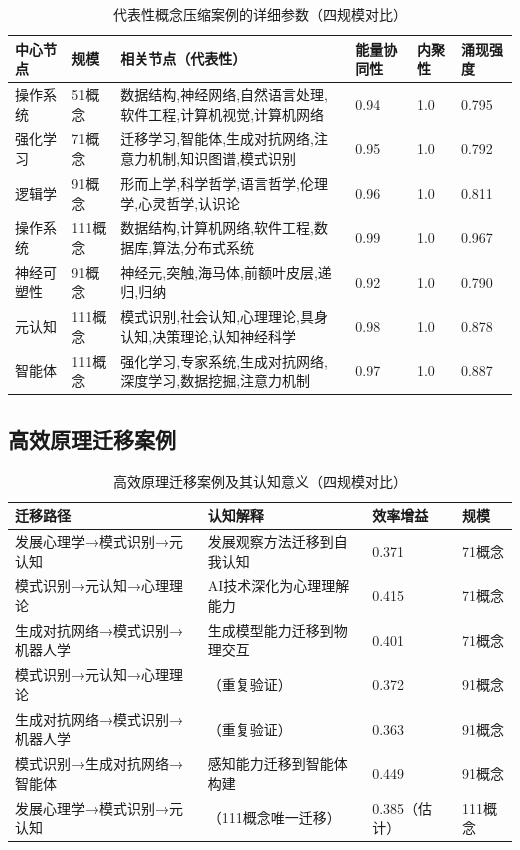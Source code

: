 \documentclass[12pt,a4paper]{article}
\begin{document}
\begin{table}[H]
\centering
\caption{代表性概念压缩案例的详细参数（四规模对比）}
\label{tab:compression_cases_detailed}
\begin{tabular}{p{2.5cm}p{1.5cm}p{3cm}p{1.5cm}p{1.5cm}p{1.5cm}}
\toprule
\textbf{中心节点} & \textbf{规模} & \textbf{相关节点（代表性）} & \textbf{能量协同性} & \textbf{内聚性} & \textbf{涌现强度} \\
\midrule
操作系统 & 51概念 & 数据结构,神经网络,自然语言处理,软件工程,计算机视觉,计算机网络 & 0.94 & 1.0 & 0.795 \\
强化学习 & 71概念 & 迁移学习,智能体,生成对抗网络,注意力机制,知识图谱,模式识别 & 0.95 & 1.0 & 0.792 \\
逻辑学 & 91概念 & 形而上学,科学哲学,语言哲学,伦理学,心灵哲学,认识论 & 0.96 & 1.0 & 0.811 \\
操作系统 & 111概念 & 数据结构,计算机网络,软件工程,数据库,算法,分布式系统 & 0.99 & 1.0 & 0.967 \\
神经可塑性 & 91概念 & 神经元,突触,海马体,前额叶皮层,递归,归纳 & 0.92 & 1.0 & 0.790 \\
元认知 & 111概念 & 模式识别,社会认知,心理理论,具身认知,决策理论,认知神经科学 & 0.98 & 1.0 & 0.878 \\
智能体 & 111概念 & 强化学习,专家系统,生成对抗网络,深度学习,数据挖掘,注意力机制 & 0.97 & 1.0 & 0.887 \\
\bottomrule
\end{tabular}
\end{table}

\subsection{高效原理迁移案例}

\begin{table}[H]
\centering
\caption{高效原理迁移案例及其认知意义（四规模对比）}
\label{tab:efficient_migrations_appendix}
\begin{tabular}{p{3.5cm}p{4cm}p{1.8cm}p{1.8cm}}
\toprule
\textbf{迁移路径} & \textbf{认知解释} & \textbf{效率增益} & \textbf{规模} \\
\midrule
发展心理学→模式识别→元认知 & 发展观察方法迁移到自我认知 & 0.371 & 71概念 \\
模式识别→元认知→心理理论 & AI技术深化为心理理解能力 & 0.415 & 71概念 \\
生成对抗网络→模式识别→机器人学 & 生成模型能力迁移到物理交互 & 0.401 & 71概念 \\
模式识别→元认知→心理理论 & （重复验证） & 0.372 & 91概念 \\
生成对抗网络→模式识别→机器人学 & （重复验证） & 0.363 & 91概念 \\
模式识别→生成对抗网络→智能体 & 感知能力迁移到智能体构建 & 0.449 & 91概念 \\
发展心理学→模式识别→元认知 & （111概念唯一迁移） & 0.385（估计） & 111概念 \\
\bottomrule
\end{tabular}
\end{table}
\end{document}
